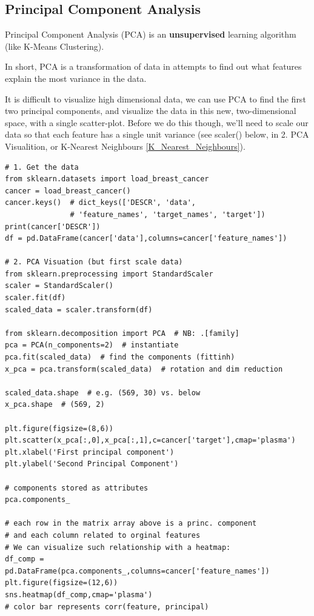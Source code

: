 \documentclass[12pt]{article}
\begin{document}
\subsection{Principal Component Analysis}
Principal Component Analysis (PCA) is an \textbf{unsupervised} learning algorithm (like K-Means Clustering).

In short, PCA is a transformation of data in attempts to find out what features explain the most variance in the data.

It is difficult to visualize high dimensional data, we can use PCA to find the first two principal components, and visualize the data in this new, two-dimensional space, with a single scatter-plot. Before we do this though, we'll need to scale our data so that each feature has a single unit variance (see scaler() below, in 2. PCA Visualition, or K-Nearest Neighbours \ref{K_Nearest_Neighbours}).

\begin{lstlisting}
# 1. Get the data
from sklearn.datasets import load_breast_cancer
cancer = load_breast_cancer()
cancer.keys()  # dict_keys(['DESCR', 'data', 
			   # 'feature_names', 'target_names', 'target'])
print(cancer['DESCR'])
df = pd.DataFrame(cancer['data'],columns=cancer['feature_names'])

# 2. PCA Visuation (but first scale data)
from sklearn.preprocessing import StandardScaler
scaler = StandardScaler() 
scaler.fit(df)
scaled_data = scaler.transform(df)

from sklearn.decomposition import PCA  # NB: .[family]
pca = PCA(n_components=2)  # instantiate
pca.fit(scaled_data)  # find the components (fittinh)
x_pca = pca.transform(scaled_data)  # rotation and dim reduction

scaled_data.shape  # e.g. (569, 30) vs. below
x_pca.shape  # (569, 2)  

plt.figure(figsize=(8,6))
plt.scatter(x_pca[:,0],x_pca[:,1],c=cancer['target'],cmap='plasma')
plt.xlabel('First principal component')
plt.ylabel('Second Principal Component')

# components stored as attributes
pca.components_

# each row in the matrix array above is a princ. component
# and each column related to orginal features
# We can visualize such relationship with a heatmap:
df_comp = pd.DataFrame(pca.components_,columns=cancer['feature_names'])
plt.figure(figsize=(12,6))
sns.heatmap(df_comp,cmap='plasma')
# color bar represents corr(feature, principal)
\end{lstlisting}
\end{document}
